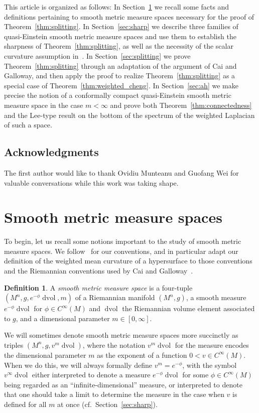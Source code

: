 \documentclass{amsart}
\theoremstyle{definition}
\newtheorem{defn}[thm]{Definition}
\theoremstyle{remark}
\numberwithin{equation}{section}
\begin{document}
This article is organized as follows: In Section~\ref{sec:smms} we recall some facts and definitions pertaining to smooth metric measure spaces necessary for the proof of Theorem~\ref{thm:splitting}.  In Section~\ref{sec:sharp} we describe three families of quasi-Einstein smooth metric measure spaces and use them to establish the sharpness of Theorem~\ref{thm:splitting}, as well as the necessity of the scalar curvature assumption in~\cite[Theorem~1.4]{MunteanuWang2011b}.  In Section~\ref{sec:splitting} we prove Theorem~\ref{thm:splitting} through an adaptation of the argument of Cai and Galloway, and then apply the proof to realize Theorem~\ref{thm:splitting} as a special case of Theorem~\ref{thm:weighted_cheng}.  In Section~\ref{sec:ah} we make precise the notion of a conformally compact quasi-Einstein smooth metric measure space in the case $m<\infty$ and prove both Theorem~\ref{thm:connectedness} and the Lee-type result on the bottom of the spectrum of the weighted Laplacian of such a space.

\subsection*{Acknowledgments}
The first author would like to thank Ovidiu Munteanu and Guofang Wei for valuable conversations while this work was taking shape.

\section{Smooth metric measure spaces}
\label{sec:smms}

To begin, let us recall some notions important to the study of smooth metric measure spaces.  We follow~\cite{Case2010a} for our conventions, and in particular adapt our definition of the weighted mean curvature of a hypersurface to those conventions and the Riemannian conventions used by Cai and Galloway~\cite{CaiGalloway1999}.

\begin{defn}
A \emph{smooth metric measure space} is a four-tuple $(M^n,g,e^{-\phi}\operatorname{dvol},m)$ of a Riemannian manifold $(M^n,g)$, a smooth measure $e^{-\phi}\operatorname{dvol}$ for $\phi\in C^\infty(M)$ and $\operatorname{dvol}$ the Riemannian volume element associated to $g$, and a dimensional parameter $m\in[0,\infty]$.
\end{defn}

We will sometimes denote smooth metric measure spaces more succinctly as triples $(M^n,g,v^m\operatorname{dvol})$, where the notation $v^m\operatorname{dvol}$ for the measure encodes the dimensional parameter $m$ as the exponent of a function $0<v\in C^\infty(M)$.  When we do this, we will always formally define $v^m=e^{-\phi}$, with the symbol $v^\infty\operatorname{dvol}$ either interpreted to denote a measure $e^{-\phi}\operatorname{dvol}$ for some $\phi\in C^\infty(M)$ being regarded as an ``infinite-dimensional'' measure, or interpreted to denote that one should take a limit to determine the measure in the case when $v$ is defined for all $m$ at once (cf.\ Section~\ref{sec:sharp}).
\end{document}
